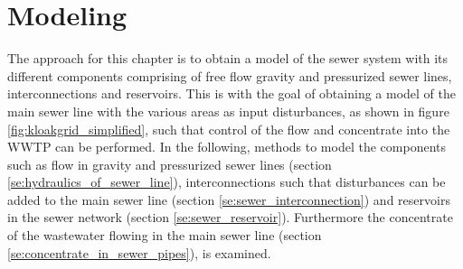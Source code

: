 \chapter{Modeling}\label{se:modeling}

The approach for this chapter is to obtain a model of the sewer system with its different components comprising of free flow gravity and pressurized sewer lines, interconnections and reservoirs. 
This is with the goal of obtaining a model of the main sewer line with the various areas as input disturbances, as shown in figure \ref{fig:kloakgrid_simplified}, such that control of the flow and concentrate into the WWTP can be performed. 
In the following, methods to model the components such as flow in gravity and pressurized sewer lines (section \ref{se:hydraulics_of_sewer_line}), interconnections such that disturbances can be added to the main sewer line (section \ref{se:sewer_interconnection}) and reservoirs in the sewer network (section \ref{se:sewer_reservoir}). Furthermore the concentrate of the wastewater flowing in the main sewer line (section \ref{se:concentrate_in_sewer_pipes}), is examined.








